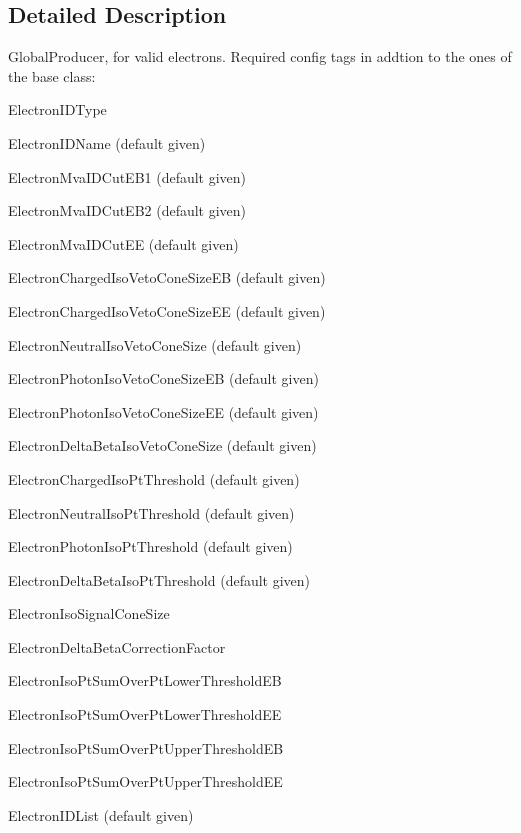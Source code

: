 \subsection{Detailed Description}
GlobalProducer, for valid electrons. Required config tags in addtion to the ones of the base class:
\begin{DoxyItemize}
\item ElectronIDType
\item ElectronIDName (default given)
\item ElectronMvaIDCutEB1 (default given)
\item ElectronMvaIDCutEB2 (default given)
\item ElectronMvaIDCutEE (default given)
\item ElectronChargedIsoVetoConeSizeEB (default given)
\item ElectronChargedIsoVetoConeSizeEE (default given)
\item ElectronNeutralIsoVetoConeSize (default given)
\item ElectronPhotonIsoVetoConeSizeEB (default given)
\item ElectronPhotonIsoVetoConeSizeEE (default given)
\item ElectronDeltaBetaIsoVetoConeSize (default given)
\item ElectronChargedIsoPtThreshold (default given)
\item ElectronNeutralIsoPtThreshold (default given)
\item ElectronPhotonIsoPtThreshold (default given)
\item ElectronDeltaBetaIsoPtThreshold (default given)
\item ElectronIsoSignalConeSize
\item ElectronDeltaBetaCorrectionFactor
\item ElectronIsoPtSumOverPtLowerThresholdEB
\item ElectronIsoPtSumOverPtLowerThresholdEE
\item ElectronIsoPtSumOverPtUpperThresholdEB
\item ElectronIsoPtSumOverPtUpperThresholdEE
\item ElectronIDList (default given) 
\end{DoxyItemize}

